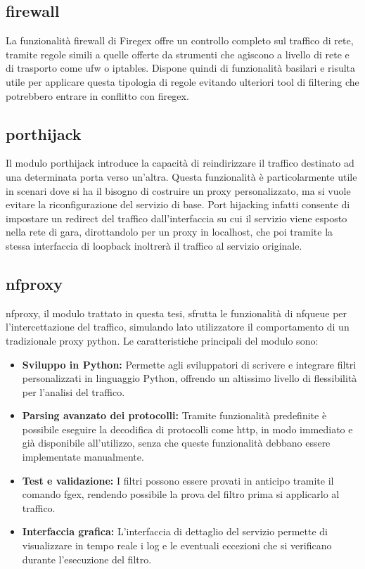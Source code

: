 \subsection{firewall}
La funzionalità firewall di Firegex offre un controllo completo sul traffico di rete, tramite regole simili a quelle offerte da strumenti che agiscono a livello di rete e di trasporto come \gls{ufw} o iptables. Dispone quindi di funzionalità basilari e risulta utile per applicare questa tipologia di regole evitando ulteriori tool di filtering che potrebbero entrare in conflitto con firegex.

\subsection{porthijack}
Il modulo \gls{porthijack} introduce la capacità di reindirizzare il traffico destinato ad una determinata porta verso un’altra. Questa funzionalità è particolarmente utile in scenari dove si ha il bisogno di costruire un proxy personalizzato, ma si vuole evitare la riconfigurazione del servizio di base. Port hijacking infatti consente di impostare un redirect del traffico dall'interfaccia su cui il servizio viene esposto nella rete di gara, dirottandolo per un proxy in localhost, che poi tramite la stessa interfaccia di loopback inoltrerà il traffico al servizio originale.

\subsection{nfproxy}
\gls{nfproxy}, il modulo trattato in questa tesi, sfrutta le funzionalità di \gls{nfqueue} per l'intercettazione del traffico, simulando lato utilizzatore il comportamento di un tradizionale proxy python. Le caratteristiche principali del modulo sono:
\begin{itemize}
    \setlength{\itemsep}{1pt}
    \setlength{\parskip}{1pt}
    \item \textbf{Sviluppo in Python:} Permette agli sviluppatori di scrivere e integrare filtri personalizzati in linguaggio Python, offrendo un altissimo livello di flessibilità per l'analisi del traffico.
    \item \textbf{Parsing avanzato dei protocolli:} Tramite funzionalità predefinite è possibile eseguire la decodifica di protocolli come \gls{http}, in modo immediato e già disponibile all'utilizzo, senza che queste funzionalità debbano essere implementate manualmente.
    \item \textbf{Test e validazione:} I filtri possono essere provati in anticipo tramite il comando fgex, rendendo possibile la prova del filtro prima si applicarlo al traffico.
    \item \textbf{Interfaccia grafica:} L'interfaccia di dettaglio del servizio permette di visualizzare in tempo reale i log e le eventuali eccezioni che si verificano durante l'esecuzione del filtro.
\end{itemize}

